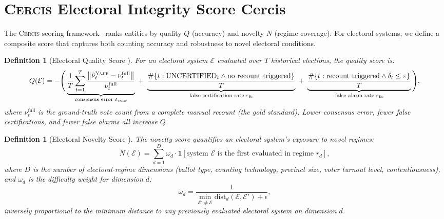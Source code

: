 \documentclass[11pt,a4paper]{article}
\newtheorem{definition}[theorem]{Definition}
\theoremstyle{definition}
\newcommand{\Yajie}{\textsc{Yajie}}
\newcommand{\Cercis}{\textsc{Cercis}}
\newcommand{\ind}[1]{\mathbf{1}[#1]}
\newcommand{\norm}[1]{\left\lVert#1\right\rVert}
\begin{document}
\section{\Cercis{} Electoral Integrity Score Cercis}
\label{sec:cercis}
The \Cercis{} scoring framework~\cite{SCX2025} ranks entities by quality $Q$ (accuracy) and novelty $N$ (regime coverage). For electoral systems, we define a composite score that captures both counting accuracy and robustness to novel electoral conditions.
\begin{definition}[Electoral Quality Score ]
\label{def:electoral_Q}
For an electoral system $\mathcal{E}$ evaluated over $T$ historical elections, the quality score is:
\begin{equation}
    Q(\mathcal{E}) = -\Bigg(
        \underbrace{\frac{1}{T}\sum_{t=1}^{T} \frac{\norm{\hat{\nu}_t^{\Yajie} - \nu_t^{\text{full}}}}{\nu_t^{\text{full}}}}_{\text{consensus error } \varepsilon_{\text{cons}}}
        \;+\;
        \underbrace{\frac{\#\{t: \text{UNCERTIFIED}_t \land \text{no recount triggered}\}}{T}}_{\text{false certification rate } \varepsilon_{\text{fc}}}
        \;+\;
        \underbrace{\frac{\#\{t: \text{recount triggered} \land \delta_t \leq \varepsilon\}}{T}}_{\text{false alarm rate } \varepsilon_{\text{fa}}}
    \Bigg),
    \label{eq:electoral_Q}
\end{equation}
where $\nu_t^{\text{full}}$ is the ground-truth vote count from a complete manual recount (the gold standard). Lower consensus error, fewer false certifications, and fewer false alarms all increase $Q$.
\end{definition}
\begin{definition}[Electoral Novelty Score ]
\label{def:electoral_N}
The novelty score quantifies an electoral system's exposure to novel regimes:
\begin{equation}
    N(\mathcal{E}) = \sum_{d=1}^{D} \omega_d \cdot \ind{\text{system } \mathcal{E} \text{ is the first evaluated in regime } r_d},
    \label{eq:electoral_N}
\end{equation}
where $D$ is the number of electoral-regime dimensions (ballot type, counting technology, precinct size, voter turnout level, contentiousness), and $\omega_d$ is the difficulty weight for dimension $d$:
\begin{equation}
    \omega_d = \frac{1}{\min_{\mathcal{E}' \neq \mathcal{E}} \text{dist}_d(\mathcal{E}, \mathcal{E}') + \epsilon},
    \label{eq:omega_d}
\end{equation}
inversely proportional to the minimum distance to any previously evaluated electoral system on dimension $d$.
\end{definition}
\end{document}
